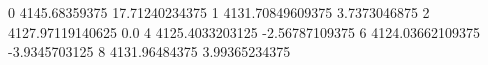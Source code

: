 0 4145.68359375 17.71240234375
1 4131.70849609375 3.7373046875
2 4127.97119140625 0.0
4 4125.4033203125 -2.56787109375
6 4124.03662109375 -3.9345703125
8 4131.96484375 3.99365234375
